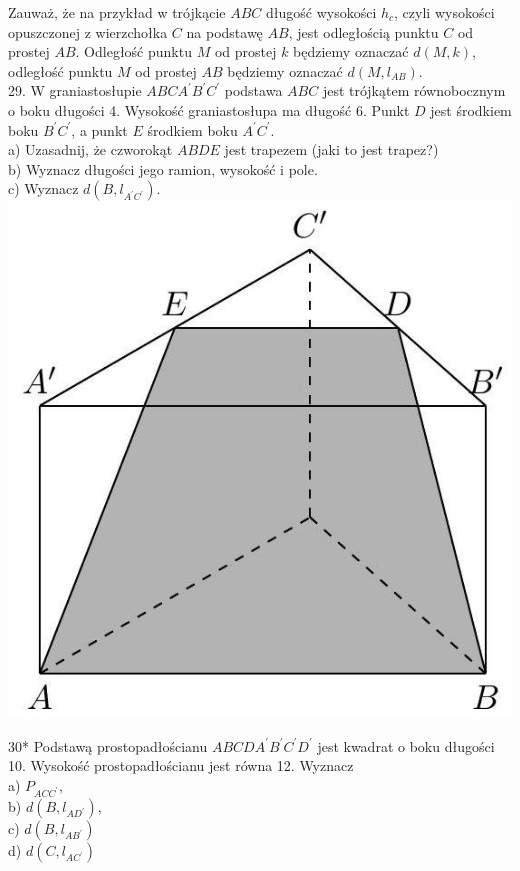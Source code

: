 \documentclass[10pt]{article}
\begin{document}
Zauważ, że na przykład w trójkącie \(A B C\) długość wysokości \(h_{c}\), czyli wysokości opuszczonej z wierzchołka \(C\) na podstawę \(A B\), jest odległością punktu \(C\) od prostej \(A B\). Odległość punktu \(M\) od prostej \(k\) będziemy oznaczać \(d(M, k)\), odległość punktu \(M\) od prostej \(A B\) będziemy oznaczać \(d\left(M, l_{A B}\right)\).\\
29. W graniastosłupie \(A B C A^{\prime} B^{\prime} C^{\prime}\) podstawa \(A B C\) jest trójkątem równobocznym o boku długości 4. Wysokość graniastosłupa ma długość 6. Punkt \(D\) jest środkiem boku \(B^{\prime} C^{\prime}\), a punkt \(E\) środkiem boku \(A^{\prime} C^{\prime}\).\\
a) Uzasadnij, że czworokąt \(A B D E\) jest trapezem (jaki to jest trapez?)\\
b) Wyznacz długości jego ramion, wysokość i pole.\\
c) Wyznacz \(d\left(B, l_{A^{\prime} C^{\prime}}\right)\).\\
\includegraphics[max width=\textwidth, center]{2024_11_21_e9b4faa005d5be2cc318g-082}

30* Podstawą prostopadłościanu \(A B C D A^{\prime} B^{\prime} C^{\prime} D^{\prime}\) jest kwadrat o boku długości 10. Wysokość prostopadłościanu jest równa 12. Wyznacz\\
a) \(P_{A C C^{\prime}}\),\\
b) \(d\left(B, l_{A D^{\prime}}\right)\),\\
c) \(d\left(B, l_{A B^{\prime}}\right)\)\\
d) \(d\left(C, l_{A C^{\prime}}\right)\)
\end{document}
